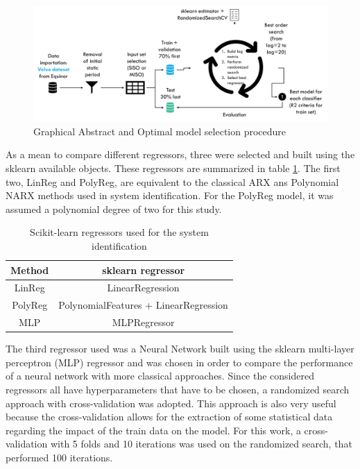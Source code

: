 \documentclass[conference]{IEEEtran}
\begin{document}
\begin{figure}[htbp]
\centerline{\includegraphics[width=6.0in]{images/graphical_abstract.png}}
\caption{Graphical Abstract and Optimal model selection procedure}
\label{graphical_abstract}
\end{figure}

As a mean to compare different regressors, three were selected and built using the sklearn available objects. These regressors are summarized in table \ref{regressors}. The  first two, LinReg and PolyReg, are equivalent to the classical ARX ans Polynomial NARX methods used in system identification. For the PolyReg model, it was assumed a polynomial degree of two for this study.

\begin{table}[htbp]
\caption{Scikit-learn regressors used for the system identification}
\begin{center}
\begin{tabular}{|c|c|}
\hline
\textbf{Method}&{\textbf{sklearn regressor}} \\
\hline
LinReg & LinearRegression  \\
\hline
PolyReg & PolynomialFeatures + LinearRegression   \\
\hline
MLP & MLPRegressor  \\
\hline
\end{tabular}
\label{regressors}
\end{center}
\end{table}

The third regressor used was a Neural Network built using the sklearn multi-layer perceptron (MLP) regressor and was chosen in order to compare the performance of a neural network with more classical approaches. Since the considered regressors all have hyperparameters that have to be chosen, a randomized search approach with cross-validation was adopted. This approach is also very useful because the cross-validation allows for the extraction of some statistical data regarding the impact of the train data on the model. For this work, a cross-validation with 5 folds and 10 iterations was used on the randomized search, that performed 100 iterations. 
\end{document}
